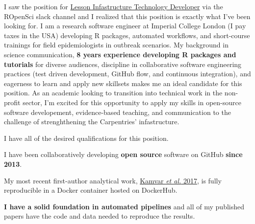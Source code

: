 I saw the position for
\href{https://static.carpentries.org/lesson-infrastructure-technology-developer/}{Lesson
Infastructure Technology Developer} via the ROpenSci slack channel and I
realized that this position is exactly what I've been looking for. I am a
research software engineer at Imperial College London (I pay taxes in the USA)
developing R packages, automated workflows, and short-course trainings for
field epidemiologists in outbreak scenarios. 
My background in science
communication, \textbf{8 years experience developing R packages and tutorials}
for diverse audiences, discipline in collaborative software engineering
practices (test driven development, GitHub flow, and continuous integration),
and eagerness to learn and apply new skillsets makes me an ideal candidate for
this position.  As an academic looking to transition into technical work in the
non-profit sector, I'm excited for this opportunity to apply my skills in
open-source software developement, evidence-based teaching, and communication
to the challenge of strenghthening the Carpentries' infastructure. 

\vspace{1ex}




I have all of the desired qualifications for this position.


I have been collaboratively developing \textbf{open source} software on GitHub \textbf{since 2013}.


My most recent first-author analytical work,
\href{https://peerj.com/articles/4152/}{Kamvar \textit{et al.} 2017}, is fully
reproducible in a Docker container hosted on
DockerHub.

\textbf{I have a solid foundation in automated
pipelines} and all of my published papers have the code and data needed to
reproduce the results.  

